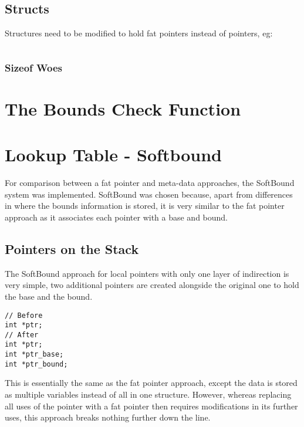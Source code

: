 \subsection{Structs}

Structures need to be modified to hold fat pointers instead of pointers, eg:

\begin{verbatim}

\end{verbatim}
	
\subsubsection{Sizeof Woes}

\section{The Bounds Check Function}

\section{Lookup Table - Softbound}

For comparison between a fat pointer and meta-data approaches, the SoftBound system was implemented.
SoftBound was chosen because, apart from differences in where the bounds information is stored, it is very similar to the fat pointer approach as it associates each pointer with a base and bound.

\subsection{Pointers on the Stack}

The SoftBound approach for local pointers with only one layer of indirection is very simple, two additional pointers are created alongside the original one to hold the base and the bound.

\begin{verbatim}
// Before
int *ptr;
// After
int *ptr;
int *ptr_base;
int *ptr_bound;
\end{verbatim}

This is essentially the same as the fat pointer approach, except the data is stored as multiple variables instead of all in one structure.
However, whereas replacing all uses of the pointer with a fat pointer then requires modifications in its further uses, this approach breaks nothing further down the line.

